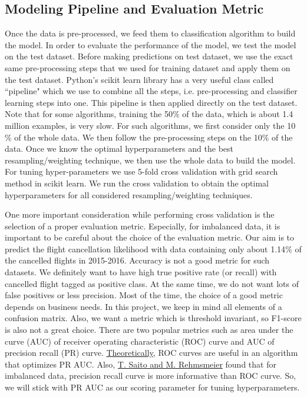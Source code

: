 \documentclass[12pt]{article}
\begin{document}
\subsection{Modeling Pipeline and Evaluation Metric}
\label{sec:pipe}
Once the data is pre-processed, we feed them to classification algorithm to build the model. In order to evaluate the performance of the model, we test the model on the test dataset. Before making predictions on test dataset, we use the exact same pre-processing steps that we used for training dataset and apply them on the test dataset. Python's scikit learn library has a very useful class called ``pipeline" which we use to combine all the steps, i.e. pre-processing and classifier learning steps into one. This pipeline is then applied directly on the test dataset. Note that for some algorithms, training the 50$\%$ of the data, which is about 1.4 million examples, is very slow. For such algorithms, we first consider only the 10$\%$ of the whole data. We then follow the pre-processing steps on the 10$\%$ of the data. Once we know the optimal hyperparameters  and the best resampling/weighting technique, we then use the whole data to build the model. For tuning hyper-parameters we use 5-fold cross validation with grid search method in scikit learn. We run the cross validation to obtain the optimal hyperparameters for all considered resampling/weighting techniques. 


One more important consideration while performing cross validation is the selection of a proper evaluation metric. Especially, for imbalanced data, it is important to be careful about the choice of the evaluation metric. Our aim is to predict the flight cancellation likelihood with data containing only about 1.14$\%$ of the cancelled flights in 2015-2016. Accuracy is not a good metric for such datasets. We definitely want to have high true positive rate (or recall) with cancelled flight tagged as positive class. At the same time, we do not want lots of false positives or less precision. Most of the time, the choice of a good metric depends on business needs. In this project, we keep in mind all elements of a confusion matrix. Also, we want a metric which is threshold invariant, so F1-score is also not a great choice. There are two popular metrics such as area under the curve (AUC) of receiver operating characteristic (ROC) curve and AUC of precision recall (PR) curve. \href{http://ftp.cs.wisc.edu/machine-learning/shavlik-group/davis.icml06.pdf}{Theoretically}, ROC curves are useful in an algorithm that optimizes PR AUC. Also, \href{http://journals.plos.org/plosone/article?id=10.1371/journal.pone.0118432}{T. Saito and M. Rehmsmeier} found that for imbalanced data, precision recall curve is more informative than ROC curve. So, we will stick with PR AUC as our scoring parameter for tuning hyperparameters.
\end{document}

